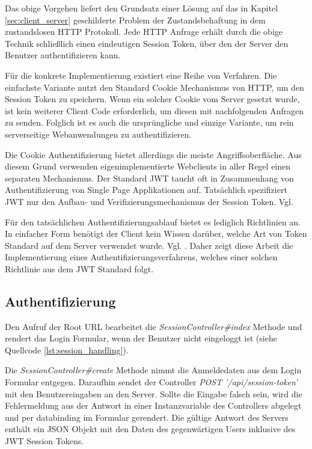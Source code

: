 Das obige Vorgehen liefert den Grundsatz einer Lösung auf das in Kapitel \ref{sec:client_server} geschilderte Problem der Zustandsbehaftung in dem zustandslosen HTTP Protokoll. Jede HTTP Anfrage erhält durch die obige Technik schließlich einen eindeutigen Session Token, über den der Server den Benutzer authentifizieren kann.

Für die konkrete Implementierung existiert eine Reihe von Verfahren. Die einfachste Variante nutzt den Standard Cookie Mechanismus von HTTP, um den Session Token zu speichern. Wenn ein solcher Cookie vom Server gesetzt wurde, ist kein weiterer Client Code erforderlich, um diesen mit nachfolgenden Anfragen zu senden. Folglich ist es auch die ursprüngliche und einzige Variante, um rein serverseitige Webanwendungen zu authentifizieren.

Die Cookie Authentifizierung bietet allerdings die meiste Angriffsoberfläche. Aus diesem Grund verwenden eigenimplementierte Webclients in aller Regel einen separaten Mechanismus. Der Standard JWT taucht oft in Zusammenhang von Authentifizierung von Single Page Applikationen auf. Tatsächlich spezifiziert JWT nur den Aufbau- und Verifizierungsmechanismus der Session Token. Vgl. \cite[Kap. 1]{Peyrott:2018}

Für den tatsächlichen Authentifizierungsablauf bietet es lediglich Richtlinien an. In einfacher Form benötigt der Client kein Wissen darüber, welche Art von Token Standard auf dem Server verwendet wurde. Vgl. \cite[Kap. 2.2]{Peyrott:2018}. Daher zeigt diese Arbeit die Implementierung eines Authentifizierungsverfahrens, welches einer solchen Richtlinie aus dem JWT Standard folgt.

\subsection{Authentifizierung}

Den Aufruf der Root URL bearbeitet die \emph{SessionController\#index} Methode und rendert das Login Formular, wenn der Benutzer nicht eingeloggt ist (siehe Quellcode \ref{lst:session_handling}).

Die \emph{SessionController\#create} Methode nimmt die Anmeldedaten aus dem Login Formular entgegen. Daraufhin sendet der Controller \emph{POST '/api/session-token'} mit den Benutzereingaben an den Server. Sollte die Eingabe falsch sein, wird die Fehlermeldung aus der Antwort in einer Instanzvariable des Controllers abgelegt und per \gls{databinding} im Formular gerendert. Die gültige Antwort des Servers enthält ein JSON Objekt mit den Daten des gegenwärtigen Users inklusive des JWT Session Tokens.


